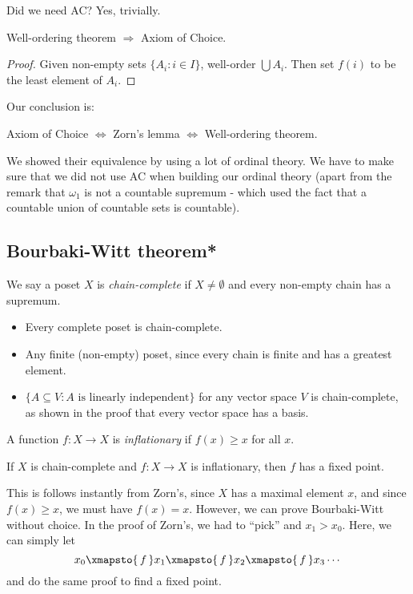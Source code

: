 \documentclass[a4paper]{article}
\begin{document}
Did we need AC? Yes, trivially.
\begin{thm}
  Well-ordering theorem $\Rightarrow $ Axiom of Choice.
\end{thm}

\begin{proof}
  Given non-empty sets $\{A_i: i\in I\}$, well-order $\bigcup A_i$. Then set $f(i)$ to be the least element of $A_i$.
\end{proof}
Our conclusion is:
\begin{center}
  Axiom of Choice $\Leftrightarrow$ Zorn's lemma $\Leftrightarrow$ Well-ordering theorem.
\end{center}
\note We showed their equivalence by using a lot of ordinal theory. We have to make sure that we did not use AC when building our ordinal theory (apart from the remark that $\omega_1$ is not a countable supremum - which used the fact that a countable union of countable sets is countable).

\subsection{Bourbaki-Witt theorem*}
\begin{defi}
  We say a poset $X$ is \emph{chain-complete} if $X \not=\emptyset$ and every non-empty chain has a supremum.
\end{defi}

\begin{eg}\leavevmode
  \begin{itemize}
    \item Every complete poset is chain-complete.
    \item Any finite (non-empty) poset, since every chain is finite and has a greatest element.
    \item $\{A\subseteq V:  A\text{ is linearly independent}\}$ for any vector space $V$ is chain-complete, as shown in the proof that every vector space has a basis.
  \end{itemize}
\end{eg}

\begin{defi}
  A function $f: X\to X$ is \emph{inflationary} if $f(x) \geq x$ for all $x$.
\end{defi}

\begin{thm}
  If $X$ is chain-complete and $f: X\to X$ is inflationary, then $f$ has a fixed point.
\end{thm}
This is follows instantly from Zorn's, since $X$ has a maximal element $x$, and since $f(x) \geq x$, we must have $f(x) = x$. However, we can prove Bourbaki-Witt without choice. In the proof of Zorn's, we had to ``pick'' and $x_1 > x_0$. Here, we can simply let
\[
  x_0 \xmapsto{\,f\,} x_1 \xmapsto{\,f\,} x_2 \xmapsto{\,f\,} x_3 \cdots
\]
and do the same proof to find a fixed point.
\end{document}

